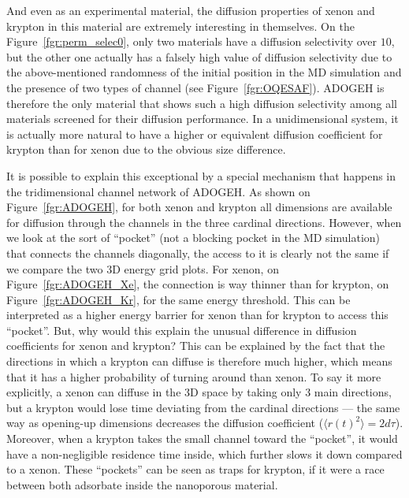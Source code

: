 \documentclass[main]{subfiles}
\begin{document}
And even as an experimental material, the diffusion properties of xenon and krypton in this material are extremely interesting in themselves. On the Figure~\ref{fgr:perm_selec0}, only two materials have a diffusion selectivity over $10$, but the other one actually has a falsely high value of diffusion selectivity due to the above-mentioned randomness of the initial position in the MD simulation and the presence of two types of channel (see Figure~\ref{fgr:OQESAF}). ADOGEH is therefore the only material that shows such a high diffusion selectivity among all materials screened for their diffusion performance. In a unidimensional system, it is actually more natural to have a higher or equivalent diffusion coefficient for krypton than for xenon due to the obvious size difference. 

It is possible to explain this exceptional by a special mechanism that happens in the tridimensional channel network of ADOGEH. As shown on Figure~\ref{fgr:ADOGEH}, for both xenon and krypton all dimensions are available for diffusion through the channels in the three cardinal directions. However, when we look at the sort of ``pocket'' (not a blocking pocket in the MD simulation) that connects the channels diagonally, the access to it is clearly not the same if we compare the two 3D energy grid plots. For xenon, on Figure~\ref{fgr:ADOGEH_Xe}, the connection is way thinner than for krypton, on Figure~\ref{fgr:ADOGEH_Kr}, for the same energy threshold. This can be interpreted as a higher energy barrier for xenon than for krypton to access this ``pocket''. But, why would this explain the unusual difference in diffusion coefficients for xenon and krypton? This can be explained by the fact that the directions in which a krypton can diffuse is therefore much higher, which means that it has a higher probability of turning around than xenon. To say it more explicitly, a xenon can diffuse in the 3D space by taking only 3 main directions, but a krypton would lose time deviating from the cardinal directions --- the same way as opening-up dimensions decreases the diffusion coefficient ($\langle{r(t)}^2\rangle=2d\tau$). Moreover, when a krypton takes the small channel toward the ``pocket'', it would have a non-negligible residence time inside, which further slows it down compared to a xenon. These ``pockets'' can be seen as traps for krypton, if it were a race between both adsorbate inside the nanoporous material. 
\end{document}
